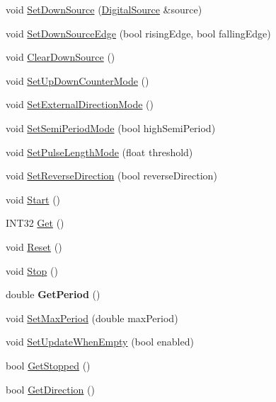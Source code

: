 \begin{DoxyCompactItemize}
\item 
void \hyperlink{classCounter_a68fa4169dd3cf9a0c58de786f2d69c76}{\-Set\-Down\-Source} (\hyperlink{classDigitalSource}{\-Digital\-Source} \&source)
\item 
void \hyperlink{classCounter_a929a270422ce7fe72955f76e33e60fd2}{\-Set\-Down\-Source\-Edge} (bool rising\-Edge, bool falling\-Edge)
\item 
void \hyperlink{classCounter_a14f57c89d5e20d5ca590877dcc6be50f}{\-Clear\-Down\-Source} ()
\item 
void \hyperlink{classCounter_aa71cea0b77f6664454f0f56a665b00c4}{\-Set\-Up\-Down\-Counter\-Mode} ()
\item 
void \hyperlink{classCounter_a750cad2fc33948da6a8f595bfdd126c8}{\-Set\-External\-Direction\-Mode} ()
\item 
void \hyperlink{classCounter_a1047b8a9c109942ecbbeaa66a1ba1842}{\-Set\-Semi\-Period\-Mode} (bool high\-Semi\-Period)
\item 
void \hyperlink{classCounter_adc8d4c41b26c8654fe3775afdb6439f5}{\-Set\-Pulse\-Length\-Mode} (float threshold)
\item 
void \hyperlink{classCounter_ab9f8c0a4b5491767c48262a5471992cd}{\-Set\-Reverse\-Direction} (bool reverse\-Direction)
\item 
void \hyperlink{classCounter_a0766c0a11e84866758b20b29e2e17cc0}{\-Start} ()
\item 
\-I\-N\-T32 \hyperlink{classCounter_ad8b0c5e46e0360f93554530d90d553b8}{\-Get} ()
\item 
void \hyperlink{classCounter_a006032d39fada9ad683ccc849d2f60d3}{\-Reset} ()
\item 
void \hyperlink{classCounter_aa6ea006a3109769cc1e0a37dc25e11f4}{\-Stop} ()
\item 
\hypertarget{classCounter_a51030989a5ee306beaf40ac28ab362c0}{double {\bfseries \-Get\-Period} ()}\label{classCounter_a51030989a5ee306beaf40ac28ab362c0}

\item 
void \hyperlink{classCounter_a8496d29a6b9424f76075396e9c729bca}{\-Set\-Max\-Period} (double max\-Period)
\item 
void \hyperlink{classCounter_a6701899f12600eabff3345223d65d4db}{\-Set\-Update\-When\-Empty} (bool enabled)
\item 
bool \hyperlink{classCounter_ae6bea5b908b1c276e8592e18656aaf21}{\-Get\-Stopped} ()
\item 
bool \hyperlink{classCounter_acdfa2215fb973249a5f0d2a9f2f3c6b6}{\-Get\-Direction} ()
\end{DoxyCompactItemize}


